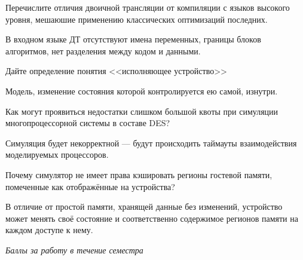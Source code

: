 \documentclass[a4paper, addpoints]{exam}
\begin{document}
\begin{questions}
\question[3] Перечислите отличия двоичной трансляции от компиляции с языков высокого уровня, мешаюшие применению классических оптимизаций последних.
\begin{solution}[3cm]
В входном языке ДТ отсутствуют имена переменных, границы блоков алгоритмов, нет разделения между кодом и данными.
\end{solution}


\question[3] Дайте определение понятия <<исполняющее устройство>>
\begin{solution}[1cm]
Модель, изменение состояния которой контролируется ею самой, изнутри.
\end{solution}

\question[3] Как могут проявиться недостатки слишком большой квоты при симуляции многопроцессорной системы в составе DES?
\begin{solution}[2cm]
    Симуляция будет некорректной --- будут происходить таймауты взаимодействия моделируемых процессоров.
\end{solution}

\question[1] Почему симулятор не имеет права кэшировать регионы гостевой памяти, помеченные как отображённые на устройства?
\begin{solution}[2cm]
В отличие от простой памяти, хранящей данные без изменений, устройство может менять своё состояние и соответственно содержимое регионов памяти на каждом доступе к нему.
\end{solution}





\bonusquestion \textit{Баллы за работу в течение семестра}

\newpage
\phantom{Blank page}



\end{questions}
\end{document}
